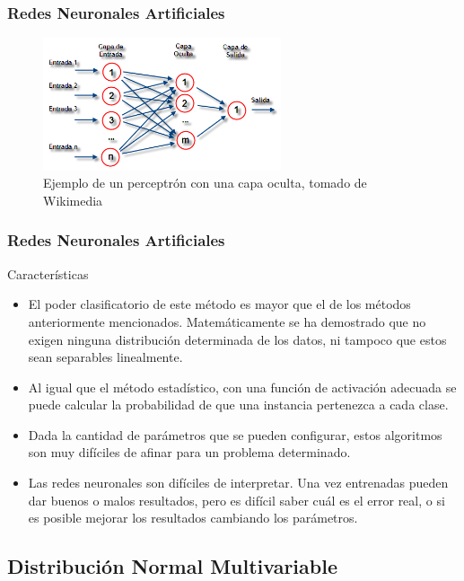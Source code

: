 \documentclass{beamer}
\begin{document}
	\begin{frame}
	\frametitle{Redes Neuronales Artificiales}
	\begin{figure}[htb]
	\begin{center}
	\leavevmode
	\includegraphics[width=7cm]{img/rna.png}
	\end{center}
	\caption{Ejemplo de un perceptrón con una capa oculta, tomado de Wikimedia}
	\label{fig:rna}
	\end{figure}
	\end{frame}
	
	\begin{frame}
	\frametitle{Redes Neuronales Artificiales}
	\begin{block}{Características}
	\begin{itemize}
	\item El poder clasificatorio de este método es mayor que el de los métodos anteriormente mencionados. Matemáticamente se ha demostrado que no exigen ninguna distribución determinada de los datos, ni tampoco que estos sean separables linealmente. \pause
	\item Al igual que el método estadístico, con una función de activación adecuada se puede calcular la probabilidad de que una instancia pertenezca a cada clase. \pause
	\item Dada la cantidad de parámetros que se pueden configurar, estos algoritmos son muy difíciles de afinar para un problema determinado. \pause
	\item Las redes neuronales son difíciles de interpretar. Una vez entrenadas pueden dar buenos o malos resultados, pero es difícil saber cuál es el error real, o si es posible mejorar los resultados cambiando los parámetros. 
	\end{itemize}
	\end{block}
	\end{frame}
	
	\subsection{Distribución Normal Multivariable}
	
\end{document}
